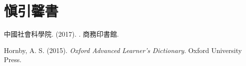 \chapter{愼引馨書}
\par 中國社會科學院. (2017). . 商務印書館.
\par Hornby, A. S. (2015). \textit{Oxford Advanced Learner's Dictionary}. Oxford University Press.
